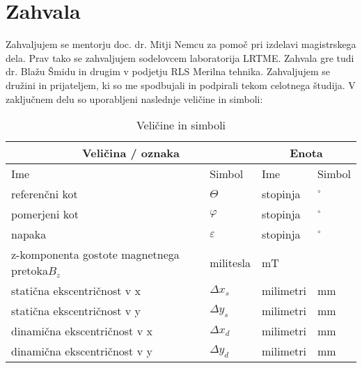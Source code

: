 \documentclass[a4paper,twoside,openright,12pt]{book}
\date{Ljubljana, 2018}
\begin{document}
\frontmatter
%
%
\maketitle
%
%
\chapter*{Zahvala}
Zahvaljujem se mentorju doc. dr. Mitji Nemcu za pomoč pri izdelavi magistrskega dela. Prav tako se zahvaljujem sodelovcem laboratorija LRTME.
Zahvala gre tudi dr. Blažu Šmidu in drugim v podjetju RLS Merilna tehnika.
Zahvaljujem se družini in prijateljem, ki so me spodbujali in podpirali tekom celotnega študija.
%
%
\tableofcontents
%
\seznamslik
\seznamtabel
%
%
\seznamsimbolov
V zaključnem delu so uporabljeni naslednje veličine in
simboli:
%
\begin{table}[h]
\centering
\begin{tabular}{l l l l}
 \hline \multicolumn{2}{c}{\bf{Veličina / oznaka}} & \multicolumn{2}{c}{\bf{Enota}}  \\
 \hline
Ime & Simbol & Ime & Simbol \\
 \hline
 referenčni kot & $\Theta$  & stopinja & $^\circ$ \\
 pomerjeni kot & $\varphi$  & stopinja & $^\circ$ \\
 napaka& $\varepsilon$& stopinja & $^\circ$ \\
 z-komponenta gostote magnetnega pretoka$B_z$& militesla & mT \\
 statična ekscentričnost v x&$\Delta x_s$& milimetri & mm \\
 statična ekscentričnost v y&$\Delta y_s$& milimetri & mm \\
 dinamična ekscentričnost v x&$\Delta x_d$& milimetri & mm \\
 dinamična ekscentričnost v y&$\Delta y_d$& milimetri & mm \\
  \hline
\end{tabular}
  \caption{Veličine in simboli}
  \label{prebojne_trdnosti}
\end{table}
%
%
%
%
\mainmatter
%
%
\povzetek
\end{document}
